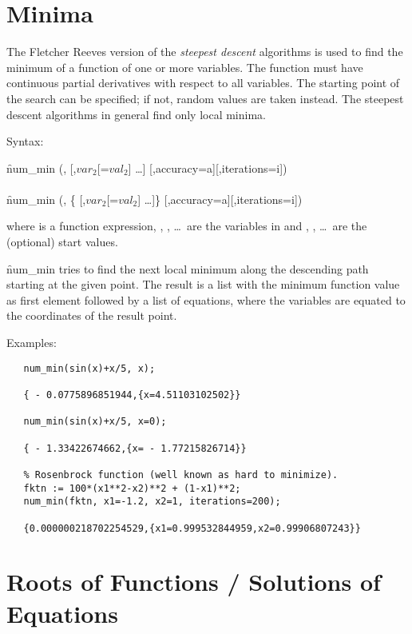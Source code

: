 \section{Minima}
\hypertarget{operator:NUM_MIN}{}

The Fletcher Reeves version of the \emph{steepest descent}
algorithms is used to find the minimum of a
function of one or more variables. The
function must have continuous partial derivatives with respect to all
variables. The starting point of the search can be
specified; if not, random values are taken instead.
The steepest descent algorithms in general find only local
minima.

Syntax:
\begin{syntaxtable}
  \f{num\_min} (,  [,$var_2$[=$val_2$] \ldots]
             [,accuracy=a][,iterations=i]) \\
\\
  \f{num\_min} (, \{ [,$var_2$[=$val_2$] \ldots]\}
             [,accuracy=a][,iterations=i])
\end{syntaxtable}
where  is a function expression, , , \ldots\ are
the variables in  and , , \ldots\  are
the (optional) start values.

\f{num\_min} tries to find the next local minimum along the descending
path starting at the given point. The result is a list
with the minimum function value as first element followed by a list
of equations, where the variables are equated to the coordinates
of the result point.

Examples:
\begin{verbatim}
   num_min(sin(x)+x/5, x);

   { - 0.0775896851944,{x=4.51103102502}}

   num_min(sin(x)+x/5, x=0);

   { - 1.33422674662,{x= - 1.77215826714}}

   % Rosenbrock function (well known as hard to minimize).
   fktn := 100*(x1**2-x2)**2 + (1-x1)**2;
   num_min(fktn, x1=-1.2, x2=1, iterations=200);

   {0.000000218702254529,{x1=0.999532844959,x2=0.99906807243}}

\end{verbatim}

\section{Roots of Functions / Solutions of Equations}
\hypertarget{operator:NUM_SOLVE}{}

